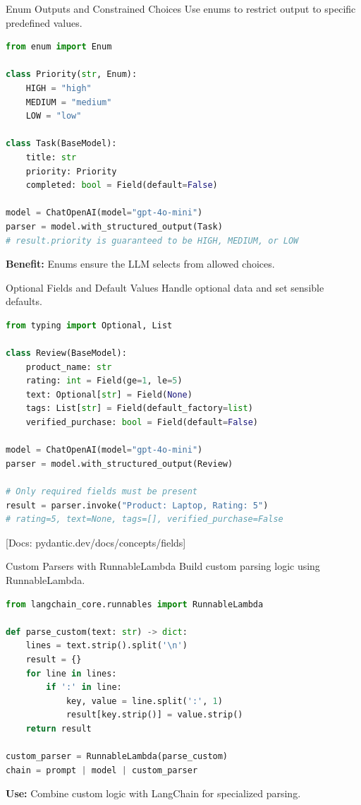 \documentclass[aspectratio=169,11pt]{beamer}
\newcommand{\docref}[1]{{\scriptsize\color{docgray}[Docs: #1]}}
\begin{document}
\begin{frame}[fragile]{Enum Outputs and Constrained Choices}
Use enums to restrict output to specific predefined values.

\begin{lstlisting}[language=Python]
from enum import Enum

class Priority(str, Enum):
    HIGH = "high"
    MEDIUM = "medium"
    LOW = "low"

class Task(BaseModel):
    title: str
    priority: Priority
    completed: bool = Field(default=False)

model = ChatOpenAI(model="gpt-4o-mini")
parser = model.with_structured_output(Task)
# result.priority is guaranteed to be HIGH, MEDIUM, or LOW
\end{lstlisting}

\vspace{0.08cm}

\textbf{Benefit:} Enums ensure the LLM selects from allowed choices.
\end{frame}

\begin{frame}[fragile]{Optional Fields and Default Values}
Handle optional data and set sensible defaults.

\begin{lstlisting}[language=Python]
from typing import Optional, List

class Review(BaseModel):
    product_name: str
    rating: int = Field(ge=1, le=5)
    text: Optional[str] = Field(None)
    tags: List[str] = Field(default_factory=list)
    verified_purchase: bool = Field(default=False)

model = ChatOpenAI(model="gpt-4o-mini")
parser = model.with_structured_output(Review)

# Only required fields must be present
result = parser.invoke("Product: Laptop, Rating: 5")
# rating=5, text=None, tags=[], verified_purchase=False
\end{lstlisting}

\docref{pydantic.dev/docs/concepts/fields}
\end{frame}

\begin{frame}[fragile]{Custom Parsers with RunnableLambda}
Build custom parsing logic using RunnableLambda.

\begin{lstlisting}[language=Python]
from langchain_core.runnables import RunnableLambda

def parse_custom(text: str) -> dict:
    lines = text.strip().split('\n')
    result = {}
    for line in lines:
        if ':' in line:
            key, value = line.split(':', 1)
            result[key.strip()] = value.strip()
    return result

custom_parser = RunnableLambda(parse_custom)
chain = prompt | model | custom_parser
\end{lstlisting}

\vspace{0.08cm}

\textbf{Use:} Combine custom logic with LangChain for specialized parsing.
\end{frame}
\end{document}
